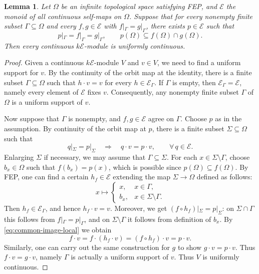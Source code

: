 \documentclass[10pt, reqno]{amsart}
\theoremstyle{plain}
\newtheorem{lemma}[theorem]{Lemma}
\numberwithin{equation}{section}
\theoremstyle{definition}
\newcommand{\E}{\mathscr E}
\begin{document}
\begin{lemma}\label{lem:common-image-interpolation}
Let $\Omega$ be an infinite topological space satisfying FEP, and $\E$ the monoid of all continuous self-maps on $\Omega$. Suppose that for every nonempty finite subset $\Gamma \subseteq \Omega$ and every $f, g \in \E$ with
$f|_\Gamma = g|_\Gamma$, there exists $p\in\E$ such that
\[
  p|_\Gamma=f|_\Gamma=g|_\Gamma,  \qquad p(\Omega) \subseteq f(\Omega) \cap g(\Omega).
\]
Then every continuous $k\E$-module is uniformly continuous.
\end{lemma}

\begin{proof}
Given a continuous $k\E$-module $V$ and $v \in V$, we need to find a uniform support for $v$. By the continuity of the orbit map at the identity, there is a finite subset $\Gamma \subseteq \Omega$ such that $h \cdot v = v$ for every $h \in \E_{\Gamma}$. If $\Gamma$ is empty, then $\E_{\Gamma} = \E$, namely every element of $\E$ fixes $v$. Consequently, any nonempty finite subset $\Gamma$ of $\Omega$ is a uniform support of $v$.

Now suppose that $\Gamma$ is nonempty, and $f, g \in \E$ agree on $\Gamma$. Choose $p$ as in the assumption. By continuity of the orbit map at $p$, there is a finite subset $\Sigma \subseteq \Omega$ such that
\begin{equation}\label{eq:common-image-local}
  q|_\Sigma = p|_\Sigma \quad \Longrightarrow \quad q \cdot v = p \cdot v, \qquad \forall \, q \in \E.
\end{equation}
Enlarging $\Sigma$ if necessary, we may assume that $\Gamma \subseteq \Sigma$. For each $x \in \Sigma \setminus \Gamma$, choose $b_x \in \Omega$ such that $f(b_x) = p(x)$, which is possible since $p(\Omega) \subseteq f(\Omega)$. By FEP, one can find a certain $h_f \in \E$ extending the map $\Sigma \to \Omega$ defined as follows:
\[
x \longmapsto
\begin{cases}
x, & x \in \Gamma,\\
b_x, & x \in \Sigma \setminus \Gamma.
\end{cases}
\]
Then $h_f \in \E_{\Gamma}$, and hence $h_f \cdot v = v$. Moreover, we get $(f \circ h_f)|_\Sigma = p|_\Sigma$: on $\Sigma \cap \Gamma$ this follows from $f|_\Gamma = p|_\Gamma$, and on $\Sigma \setminus \Gamma$ it follows from definition of $b_x$. By \eqref{eq:common-image-local} we obtain
\[
  f \cdot v = f \cdot (h_f \cdot v) = (f \circ h_f) \cdot v = p \cdot v.
\]
Similarly, one can carry out the same construction for $g$ to show $g \cdot v = p \cdot v$. Thus $f \cdot v = g \cdot v$, namely $\Gamma$ is actually a uniform support of $v$. Thus $V$ is uniformly continuous.
\end{proof}
\end{document}

